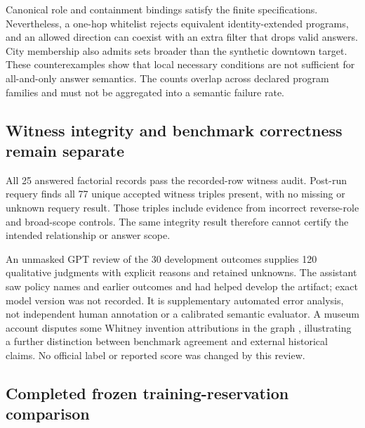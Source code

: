 \documentclass[10pt]{article}
\begin{document}
\endgroup

Canonical role and containment bindings satisfy the finite specifications. Nevertheless, a one-hop whitelist rejects equivalent identity-extended programs, and an allowed direction can coexist with an extra filter that drops valid answers. City membership also admits sets broader than the synthetic downtown target. These counterexamples show that local necessary conditions are not sufficient for all-and-only answer semantics. The counts overlap across declared program families and must not be aggregated into a semantic failure rate.\par

\subsection{Witness integrity and benchmark correctness remain separate}

All 25 answered factorial records pass the recorded-row witness audit. Post-run requery finds all 77 unique accepted witness triples present, with no missing or unknown requery result. Those triples include evidence from incorrect reverse-role and broad-scope controls. The same integrity result therefore cannot certify the intended relationship or answer scope.\par

An unmasked GPT review of the 30 development outcomes supplies 120 qualitative judgments with explicit reasons and retained unknowns. The assistant saw policy names and earlier outcomes and had helped develop the artifact; exact model version was not recorded. It is supplementary automated error analysis, not independent human annotation or a calibrated semantic evaluator. A museum account disputes some Whitney invention attributions in the graph \cite{whitneymuseum}, illustrating a further distinction between benchmark agreement and external historical claims. No official label or reported score was changed by this review.\par

\subsection{Completed frozen training-reservation comparison}

\begingroup\small\setlength{\tabcolsep}{4pt}
\end{document}
